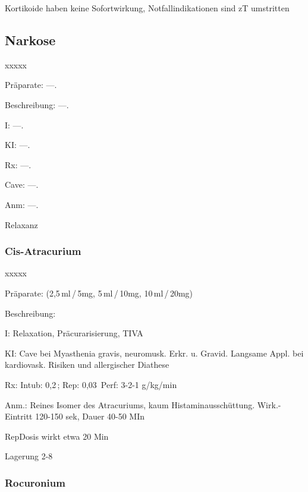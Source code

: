 Kortikoide haben keine Sofortwirkung, Notfallindikationen sind zT
umstritten

%

\subsection{Narkose}

\begin{labeling}[~]{xxxxx}
  \item[Präparate:]---.
  \item[Beschreibung:] ---.
  \item[I:] ---.
  \item[KI:] ---.
  \item[Rx:] ---.
  \item[Cave:] ---.
  \item[Anm:] ---.
\end{labeling}

Relaxanz


\subsubsection{Cis-Atracurium}

\begin{labeling}[~]{xxxxx}
  \item[Präparate:] (2,5\,ml\,/\,5mg, 5\,ml\,/\,10mg, 10\,ml\,/\,20mg)
  \item[Beschreibung:] 
  \item[I:] Relaxation, Präcurarisierung, TIVA
  \item[KI:] Cave bei Myasthenia gravis, neuromusk. Erkr. u.
Gravid.\newline
Langsame Appl. bei kardiovask. Risiken und allergischer Diathese
\item[Rx:] Intub: 0,2\,; Rep: 0,03\,\newline
Perf: 3-2-1 {\textmu}g/kg/min
\item[Anm.:]Reines Isomer des Atracuriums, kaum Histaminausschüttung.
Wirk.-Eintritt 120-150 sek, Dauer 40-50 MIn

RepDosis wirkt etwa 20 Min

Lagerung 2-8{\textcelsius}
\end{labeling}



\subsubsection{Rocuronium}


